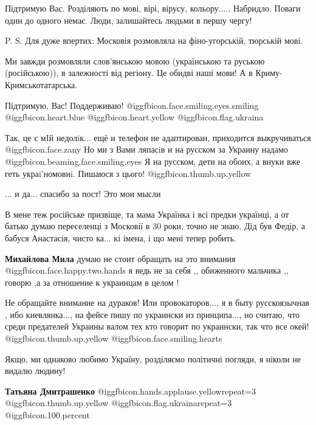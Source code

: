 \begin{itemize}

Підтримую Вас. Розділяють по мові, вірі, вірусу, кольору..... Набридло. Поваги
один до одного немає. Люди, залишайтесь людьми в першу чергу!

P. S. Для дуже впертих: Московія розмовляла на фіно-угорській, тюрській мові.

Ми завжди розмовляли слов'янською мовою (українською та руською (російською)),
в залежності від регіону. Це обидві наші мови! А в Криму- Кримськотатарська.


Підтримую, Вас! Поддерживаю! @igg{fbicon.face.smiling.eyes.smiling}  @igg{fbicon.heart.blue}  @igg{fbicon.heart.yellow} @igg{fbicon.flag.ukraina}

Так, це є мIй недолiк... ещё и телефон не адаптирован, приходится выкручиваться @igg{fbicon.face.zany} 
Но ми з Вами ляпасiв и на русском за Украину надамо @igg{fbicon.beaming.face.smiling.eyes} 
Я на русском, дети на обоих, а внуки вже геть украi’номовнi.
Пишаюся з цього! @igg{fbicon.thumb.up.yellow} 

... и да... спасибо за пост! Это мои мысли


В мене теж російське призвіще, та мама Українка і всі предки українці, а от
батько думаю переселенці з Московії в 30 роки, точно не знаю. Дід був Федір, а
бабуся Анастасія, чисто ка... кі імена, і що мені тепер робить.

\begin{itemize} %
\textbf{Михайлова Мила} думаю не стоит обращать на это внимания  @igg{fbicon.face.happy.two.hands}  я ведь не за себя ,, обиженного мальчика ,, говорю ,а за отношение к украинцам в целом !
\end{itemize} %


Не обращайте внимание на дураков! Или провокаторов..., я в быту русскоязычная ,
ибо киевлянка..., на фейсе пишу по украински из принципа..., но считаю, что
среди предателей Украины валом тех кто говорит по украински, так что все
окей! @igg{fbicon.thumb.up.yellow}  @igg{fbicon.face.smiling.hearts} 


Якщо, ми однаково любимо Україну, розділяємо політичні погляди, я ніколи не
видалю людину!

\begin{itemize} %
\textbf{Татьяна Дмитрашенко}  @igg{fbicon.hands.applause.yellow}{repeat=3}  @igg{fbicon.thumb.up.yellow} @igg{fbicon.flag.ukraina}{repeat=3} @igg{fbicon.100.percent} 
\end{itemize} %


\end{itemize}
